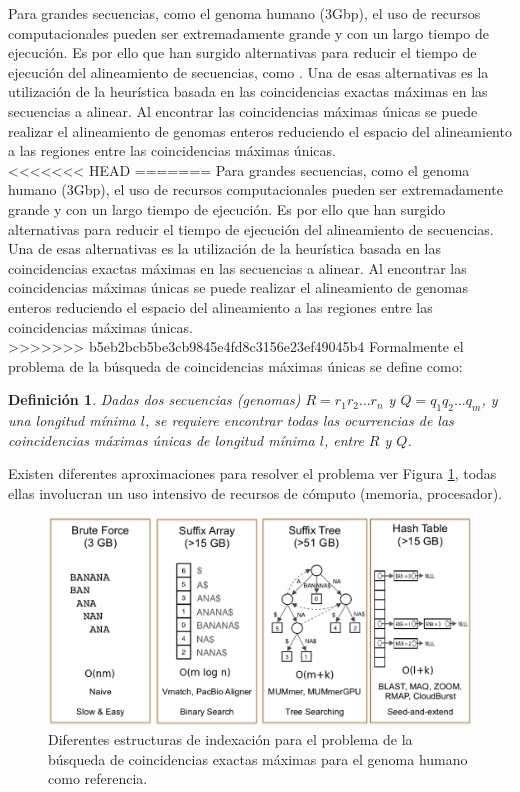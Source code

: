 \documentclass[12pt,a4paper]{article}
\newtheorem{mydef}{Definición}
\begin{document}
Para grandes secuencias, como el genoma humano (3Gbp), el uso de recursos computacionales pueden ser extremadamente grande y con un largo tiempo de ejecución. Es por ello que han surgido alternativas para reducir el tiempo de ejecución del alineamiento de secuencias, como \cite{OguzhanKulekci2011,Mongelli,Kouzinopoulos2005,Encarnac2011,Vyverman2013,OguzhanKulekci2011,Khan2009,OhlebuschGK10}. Una de esas alternativas es la utilización de la heurística basada en las coincidencias exactas máximas en las secuencias a alinear. Al encontrar las coincidencias máximas  únicas se puede realizar el alineamiento de genomas enteros reduciendo el espacio del alineamiento a las regiones entre las coincidencias máximas únicas.\\
\indent
<<<<<<< HEAD
=======
Para grandes secuencias, como el genoma humano (3Gbp), el uso de recursos computacionales pueden ser extremadamente grande y con un largo tiempo de ejecución. Es por ello que han surgido alternativas para reducir el tiempo de ejecución del alineamiento de secuencias. Una de esas alternativas es la utilización de la heurística basada en las coincidencias exactas máximas en las secuencias a alinear. Al encontrar las coincidencias máximas  únicas se puede realizar el alineamiento de genomas enteros reduciendo el espacio del alineamiento a las regiones entre las coincidencias máximas únicas.\\
\indent
>>>>>>> b5eb2bcb5be3cb9845e4fd8c3156e23ef49045b4
Formalmente el problema de la búsqueda de coincidencias máximas únicas se define como:
\begin{mydef}
  Dadas dos secuencias (genomas) $R=r_{1}r_{2}\hdots r_{n}$ y $Q=q_{1}q_{2}\hdots q_{m}$, y una longitud mínima $l$, se requiere encontrar todas las ocurrencias de las coincidencias máximas únicas de longitud mínima $l$, entre $R$ y $Q$.
\end{mydef}
Existen diferentes aproximaciones para resolver el problema ver Figura \ref{fig:state}, todas ellas involucran un uso intensivo de recursos de cómputo (memoria, procesador).
\begin{figure}[h] 
   \centering 
   \includegraphics[scale=0.3]{state.eps} 
   \caption{Diferentes estructuras de indexación para el problema de la búsqueda de coincidencias exactas máximas para el genoma humano como referencia.} 
   \label{fig:state} 
 \end{figure}
\end{document}
